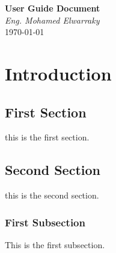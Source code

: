 \documentclass[12pt letterpaper]{report}
\begin{document}
\begin{titlepage}
    \begin{center}
        \large\textbf{User Guide Document} \\
        \large\textit{Eng. Mohamed Elwarraky}\\
        \large\today
    \end{center}

\end{titlepage}

\newpage

\chapter{Introduction}
\section{First Section}
this is the first section.

\section{Second Section}
this is the second section.

\subsection{First Subsection}
This is the first subsection.
\end{document}
